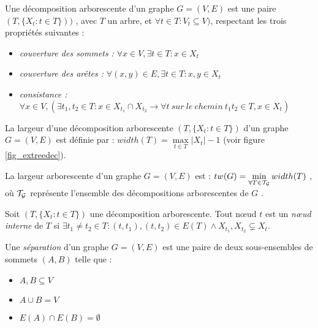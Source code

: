 
\label{treedec}
	Une décomposition arborescente d'un graphe $G = (V,E)$ est une paire
	$(T,\{X_t : t\in T\}))$
	, avec $T$ un arbre, et $\forall t \in T : V_t \subseteq V)$, respectant
	les trois propriétés suivantes :
	\begin{itemize}
		\item {\em couverture des sommets :}
		$\forall x \in V, \exists t \in T : x \in X_t$            
		\item {\em couverture des arêtes :}
		$\forall (x,y) \in E, \exists t \in T : x,y \in X_t$      
		\item {\em consistance :}
		$\forall x \in V, (\exists t_1,t_2 \in T : x\in X_{t_1} \cap X_{t_2} \rightarrow
	     \forall t\ sur\ le\ chemin\ t_1t_2 \in T, x\in X_t)$
	\end{itemize}

\label{width}
	La largeur d'une décomposition arborescente $(T,\{X_t : t \in T\})$ d'un graphe
	$G = (V,E)$ est définie par : $width(T) = \max\limits_{t \in T}|X_t| - 1$
(voir figure \ref{fig_extreedec}).



\label{treewidth}
	La largeur arborescente d'un graphe $G = (V,E)$ est :
	$tw(G) = \min\limits_{\forall T \in \cal{T}_G} width(T)$
	, où $\cal{T}_G$ représente l'ensemble des décompositions
	arborescentes de $G$ .


\label{intnode}
	Soit $(T,\{X_t : t\in T\})$ une décomposition arborescente.
	Tout n\oe ud $t$ est un {\em n\oe ud interne} de $T$ si 
	$\exists t_1 \neq t_2 \in T : (t,t_1),(t,t_2) \in E(T) \wedge X_{t_1},X_{t_2} \subsetneq X_t$.

\label{defsep}
	Une {\em séparation} d'un graphe $G = (V,E)$ est une paire de deux sous-ensembles de sommets
	$(A,B)$ telle que :
	\begin{itemize}
		\item $A,B \subseteq V$
		\item $A \cup B = V$
		\item $E(A) \cap E(B) = \emptyset$
	\end{itemize}

